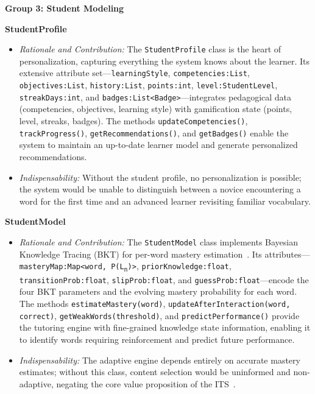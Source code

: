 \bigskip
\noindent\textbf{Group 3: Student Modeling}

\medskip
\textbf{StudentProfile}
\begin{itemize}
\item \textit{Rationale and Contribution:} The \texttt{StudentProfile} class is the heart of personalization, capturing everything the system knows about the learner. Its extensive attribute set---\texttt{learningStyle}, \texttt{competencies:List}, \texttt{objectives:List}, \texttt{history:List}, \texttt{points:int}, \texttt{level:StudentLevel}, \texttt{streakDays:int}, and \texttt{badges:List<Badge>}---integrates pedagogical data (competencies, objectives, learning style) with gamification state (points, level, streaks, badges). The methods \texttt{updateCompetencies()}, \texttt{trackProgress()}, \texttt{getRecommendations()}, and \texttt{getBadges()} enable the system to maintain an up-to-date learner model and generate personalized recommendations.
\item \textit{Indispensability:} Without the student profile, no personalization is possible; the system would be unable to distinguish between a novice encountering a word for the first time and an advanced learner revisiting familiar vocabulary.
\end{itemize}

\medskip
\textbf{StudentModel}
\begin{itemize}
\item \textit{Rationale and Contribution:} The \texttt{StudentModel} class implements Bayesian Knowledge Tracing (BKT) for per-word mastery estimation~\cite{Corbett1994}. Its attributes---\texttt{masteryMap:Map<word, P(L\textsubscript{n})>}, \texttt{priorKnowledge:float}, \texttt{transitionProb:float}, \texttt{slipProb:float}, and \texttt{guessProb:float}---encode the four BKT parameters and the evolving mastery probability for each word. The methods \texttt{estimateMastery(word)}, \texttt{updateAfterInteraction(word, correct)}, \texttt{getWeakWords(threshold)}, and \texttt{predictPerformance()} provide the tutoring engine with fine-grained knowledge state information, enabling it to identify words requiring reinforcement and predict future performance.
\item \textit{Indispensability:} The adaptive engine depends entirely on accurate mastery estimates; without this class, content selection would be uninformed and non-adaptive, negating the core value proposition of the ITS~\cite{VanLehn2011}.
\end{itemize}

